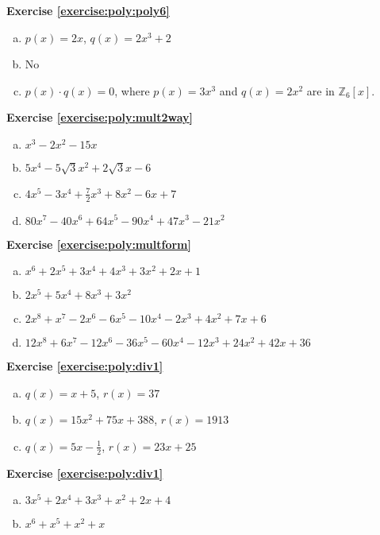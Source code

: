 \noindent\textbf{Exercise \ref{exercise:poly:poly6}}
\begin{enumerate} [(a)]
\item
 $p(x)=2x$, $q(x)=2x^3+2$
\item 
No
\item
 $p(x) \cdot q(x)=0$, where $p(x)=3x^3$ and $q(x)=2x^2$ are in $\mathbb{Z}_6[x]$.
\end{enumerate}

\noindent\textbf{Exercise \ref{exercise:poly:mult2way}}
\begin{enumerate} [(a)]
\item 
 $x^3-2x^2-15x$
\item
 $5x^4-5\sqrt{3}x^2+2\sqrt{3}x-6$
\item
$4x^5-3x^4+\frac{7}{2}x^3+8x^2-6x+7$
\item
$80x^7-40x^6+64x^5-90x^4+47x^3-21x^2$
\end{enumerate}

\noindent\textbf{Exercise \ref{exercise:poly:multform}}
\begin{enumerate} [(a)]
\item 
 $x^6+2x^5+3x^4+4x^3+3x^2+2x+1$
\item
 $2x^5+5x^4+8x^3+3x^2$
\item
$2x^8+x^7-2x^6-6x^5-10x^4-2x^3+4x^2+7x+6$
\item
$12x^8+6x^7-12x^6-36x^5-60x^4-12x^3+24x^2+42x+36$
\end{enumerate}

\noindent\textbf{Exercise \ref{exercise:poly:div1}}
\begin{enumerate} [(a)]
\item 
 $q(x)=x+5$, $r(x)=37$
\item
 $q(x)=15x^2+75x+388$, $r(x)=1913$
\item
$q(x)=5x-\frac{1}{2}$, $r(x)=23x+25$
\end{enumerate}

\noindent\textbf{Exercise \ref{exercise:poly:div1}}
\begin{enumerate} [(a)]
\item
$3x^5 + 2x^4 + 3x^3 + x^2 +2x +4$
\item
$x^6 + x^5 + x^2 + x$
\end{enumerate}



%
%
%

